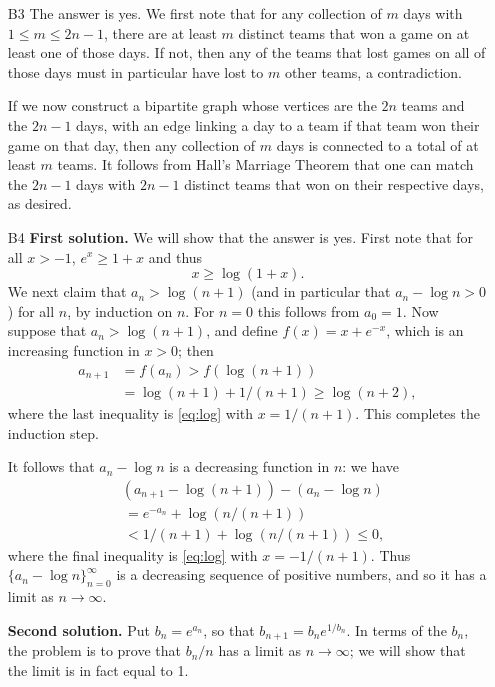 \documentclass[amssymb,twocolumn,pra,10pt,aps]{revtex4-1}
\begin{document}
\begin{itemize}
\item[B3] The answer is yes. We first note that for any collection of $m$
days with $1\leq m\leq 2n-1$, there are at least $m$ distinct teams that
won a game on at least one of those days. If not, then any of the teams
that lost games on all of those days must in particular have lost to $m$
other teams, a contradiction.

If we now construct a bipartite graph whose vertices are the $2n$ teams
and the $2n-1$ days, with an edge linking a day to a team if that team
won their game on that day, then any collection of $m$ days is connected
to a total of at least $m$ teams. It follows from Hall's Marriage Theorem
that one can match the $2n-1$ days with $2n-1$ distinct teams that won on
their respective days, as desired.

\item[B4]
\textbf{First solution.}
We will show that the answer is yes. First note that for all $x>-1$,
$e^x \geq 1+x$ and thus
\begin{equation} \label{eq:log}
x \geq \log(1+x).
\end{equation}
We next claim that $a_n > \log(n+1)$ (and in particular that $a_n-\log
n > 0$) for all $n$, by induction on $n$. For $n=0$ this follows
from $a_0=1$. Now suppose that $a_n > \log(n+1)$, and define $f(x)
= x+e^{-x}$, which is an increasing function in $x>0$; then
\begin{align*}
a_{n+1} &= f(a_n) > f(\log(n+1)) \\
&= \log(n+1) + 1/(n+1) \geq \log(n+2),
\end{align*}
where the last inequality is \eqref{eq:log} with $x=1/(n+1)$. This completes
the induction step.

It follows that $a_n-\log n$ is a decreasing function in $n$: we have
\begin{align*}
&(a_{n+1} - \log(n+1)) - (a_n - \log n) \\
&\,= e^{-a_n} + \log(n/(n+1)) \\
&\,< 1/(n+1) + \log(n/(n+1)) \leq 0,
\end{align*}
where the final inequality is \eqref{eq:log} with $x = -1/(n+1)$. Thus
$\{a_n-\log n\}_{n=0}^\infty$ is a decreasing sequence of positive numbers,
and so it has a limit as $n\to\infty$.

\noindent
\textbf{Second solution.}
Put $b_n = e^{a_n}$, so that $b_{n+1} = b_n e^{1/b_n}$.  In terms of the
$b_n$, the problem is to prove that $b_n/n$ has a limit as $n \to \infty$;
we will show that the limit is in fact equal to 1.


\end{itemize}
\end{document}
